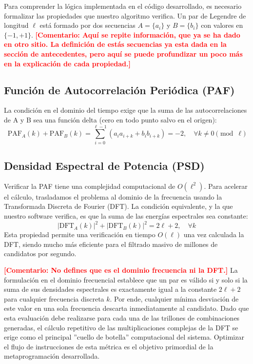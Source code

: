 \documentclass[12pt,a4paper]{tfg_domingo}
\newcommand{\Comentario}[1]{\textcolor{red}{\textbf{[Comentario:
      #1]}}}
\begin{document}
Para comprender la lógica implementada en el código desarrollado, es necesario formalizar las propiedades que nuestro algoritmo verifica. Un par de Legendre de longitud $\ell$ está formado por dos secuencias $A = \{a_i\}$ y $B = \{b_i\}$ con valores en $\{-1, +1\}$.
\Comentario{Aquí se repite información, que ya se ha dado en otro
  sitio. La definición de estás secuencias ya esta dada en la sección de antecedentes, pero aquí se puede profundizar un poco más en la explicación de cada propiedad.}
\subsection{Función de Autocorrelación Periódica (PAF)}
La condición en el dominio del tiempo exige que la suma de las autocorrelaciones de A y B sea una función delta (cero en todo punto salvo en el origen):
\[
\text{PAF}_A(k) + \text{PAF}_B(k) = \sum_{i=0}^{\ell-1} (a_i a_{i+k} + b_i b_{i+k}) = -2, \quad \forall k \neq 0 \pmod \ell
\]

\subsection{Densidad Espectral de Potencia (PSD)}
Verificar la PAF tiene una complejidad computacional de $O(\ell^2)$. Para
acelerar el cálculo, trasladamos el problema al dominio de la
frecuencia usando la Transformada Discreta de Fourier
(DFT). La condición equivalente, y la que nuestro software verifica, es que la suma de las energías espectrales sea constante:
\[
|\text{DFT}_A(k)|^2 + |\text{DFT}_B(k)|^2 = 2\ell + 2, \quad \forall k
\]
Esta propiedad permite una verificación en tiempo $O(\ell)$ una vez calculada la DFT, siendo mucho más eficiente para el filtrado masivo de millones de candidatos por segundo.


\Comentario{No defines que es el dominio frecuencia ni la DFT.}
La formulación en el dominio frecuencial establece que un par es válido si y solo si la suma de sus densidades espectrales es exactamente igual a la constante $2\ell + 2$ para cualquier frecuencia discreta $k$. Por ende, cualquier mínima desviación de este valor en una sola frecuencia descarta inmediatamente al candidato. Dado que esta evaluación debe realizarse para cada una de las trillones de combinaciones generadas, el cálculo repetitivo de las multiplicaciones complejas de la DFT se erige como el principal ''cuello de botella'' computacional del sistema. Optimizar el flujo de instrucciones de esta métrica es el objetivo primordial de la metaprogramación desarrollada.
\end{document}
